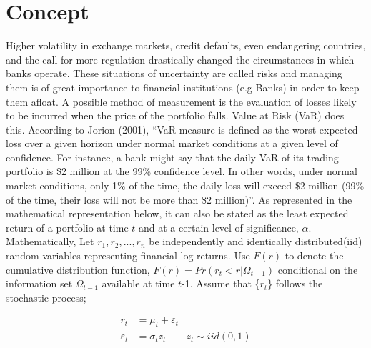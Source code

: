 \documentclass[a4paper,11pt,oneside]{book}
\begin{document}

\section{Concept}
Higher volatility in exchange markets, credit defaults, even endangering countries, and the call for more regulation drastically changed the circumstances in which banks operate. These situations of uncertainty are called risks and managing them is of great importance to financial institutions (e.g Banks) in order to keep them afloat. A possible method of measurement is the evaluation of losses likely to be incurred when the price of the portfolio falls. Value at Risk (VaR) does this.
\newline\newline
According to Jorion (2001), “VaR measure is defined as the worst
expected loss over a given horizon under normal market conditions
at a given level of confidence. For instance, a bank might say that
the daily VaR of its trading portfolio is \$2 million at the 99\%
confidence level. In other words, under normal market conditions,
only 1\% of the time, the daily loss will exceed \$2 million (99\% of the time, their loss will not be more than \$2 million)”. As represented in the mathematical representation below, it can also be stated as the least expected return of a portfolio at time $t$ and at a certain level of significance, $\alpha$.
\newline\newline
Mathematically,\newline\newline
Let $r_1, r_2, ..., r_n$ be independently and identically distributed(iid) random variables representing financial log returns. Use $F(r)$ to denote the cumulative distribution function,
$F(r) = Pr(r_{t} < r|\Omega_{t-1})$ conditional on the information set $\Omega_{t-1}$ available at time $t$-1. Assume that \{$r_t$\} follows the stochastic process; \newline

\begin{equation}
\begin{aligned}
r_t &= \mu_t + \varepsilon_t
\\
\varepsilon_t &= \sigma_t  z_t \qquad   z_t \sim iid(0,1)
\label{1}
\end{aligned}
\end{equation}
\end{document}
